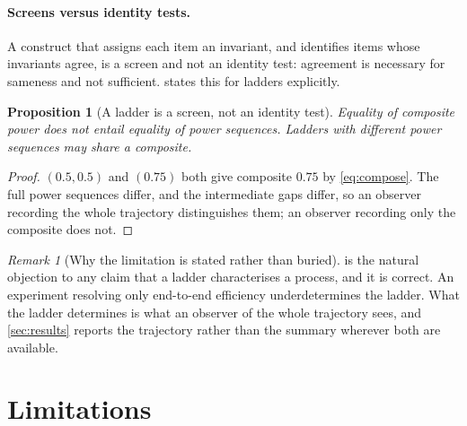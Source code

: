 \documentclass[11pt,twocolumn,a4paper]{article}
\theoremstyle{plain}
\newtheorem{proposition}[theorem]{Proposition}
\theoremstyle{definition}
\theoremstyle{remark}
\newtheorem{remark}[theorem]{Remark}
\begin{document}
\paragraph{Screens versus identity tests.} A construct that assigns each item
an invariant, and identifies items whose invariants agree, is a screen and not
an identity test: agreement is necessary for sameness and not sufficient.
 states this for ladders explicitly.

\begin{proposition}[A ladder is a screen, not an identity test]
\label{prop:converse-note}
Equality of composite power does not entail equality of power sequences.
Ladders with different power sequences may share a composite.
\end{proposition}

\begin{proof}
$(0.5,0.5)$ and $(0.75)$ both give composite $0.75$ by \cref{eq:compose}. The
full power sequences differ, and the intermediate gaps differ, so an observer
recording the whole trajectory distinguishes them; an observer recording only
the composite does not.
\end{proof}

\begin{remark}[Why the limitation is stated rather than buried]
\label{rem:screen}
 is the natural objection to any claim that a ladder
characterises a process, and it is correct. An experiment resolving only
end-to-end efficiency underdetermines the ladder. What the ladder determines is
what an observer of the whole trajectory sees, and \cref{sec:results} reports
the trajectory rather than the summary wherever both are available.
\end{remark}

\section{Limitations}
\label{sec:limitations}
\end{document}
